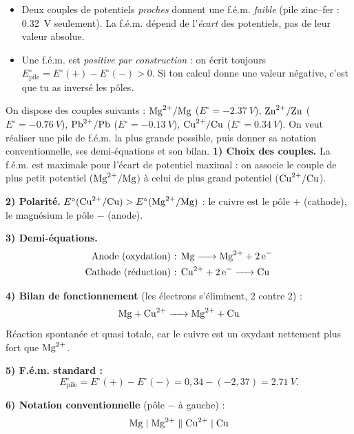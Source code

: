 \documentclass[11pt]{article}
\begin{document}
\begin{attention}
\begin{itemize}
\item Deux couples de potentiels \emph{proches} donnent une f.é.m. \emph{faible} (pile zinc--fer : \SI{0,32}{V} seulement). La f.é.m. dépend de l'\emph{écart} des potentiels, pas de leur valeur absolue.
\item Une f.é.m. est \emph{positive par construction} : on écrit toujours $E^\circ_{\text{pile}} = E^\circ(+) - E^\circ(-) > 0$. Si ton calcul donne une valeur négative, c'est que tu as inversé les pôles.
\end{itemize}
\end{attention}

\begin{exoresolu}
On dispose des couples suivants : $\ce{Mg^2+}/\ce{Mg}$ ($E^\circ = \SI{-2,37}{V}$), $\ce{Zn^2+}/\ce{Zn}$ ($E^\circ = \SI{-0,76}{V}$), $\ce{Pb^2+}/\ce{Pb}$ ($E^\circ = \SI{-0,13}{V}$), $\ce{Cu^2+}/\ce{Cu}$ ($E^\circ = \SI{+0,34}{V}$). On veut réaliser une pile de f.é.m. la plus grande possible, puis donner sa notation conventionnelle, ses demi-équations et son bilan.
\tcblower
\textbf{1) Choix des couples.} La f.é.m. est maximale pour l'écart de potentiel maximal : on associe le couple de plus petit potentiel ($\ce{Mg^2+}/\ce{Mg}$) à celui de plus grand potentiel ($\ce{Cu^2+}/\ce{Cu}$).

\textbf{2) Polarité.} $E^\circ(\ce{Cu^2+}/\ce{Cu}) > E^\circ(\ce{Mg^2+}/\ce{Mg})$ : le cuivre est le pôle $+$ (cathode), le magnésium le pôle $-$ (anode).

\textbf{3) Demi-équations.}
\begin{align*}
\text{Anode (oxydation) : } & \ce{Mg -> Mg^2+ + 2 e-}\\
\text{Cathode (réduction) : } & \ce{Cu^2+ + 2 e- -> Cu}
\end{align*}

\textbf{4) Bilan de fonctionnement} (les électrons s'éliminent, 2 contre 2) :
\[ \ce{Mg + Cu^2+ -> Mg^2+ + Cu} \]
Réaction spontanée et quasi totale, car le cuivre est un oxydant nettement plus fort que $\ce{Mg^2+}$.

\textbf{5) F.é.m. standard :}
\[ E^\circ_{\text{pile}} = E^\circ(+) - E^\circ(-) = 0{,}34 - (-2{,}37) = \SI{2,71}{V}. \]

\textbf{6) Notation conventionnelle} (pôle $-$ à gauche) :
\[ \ce{Mg} \mid \ce{Mg^2+} \parallel \ce{Cu^2+} \mid \ce{Cu} \]
\end{exoresolu}
\end{document}
